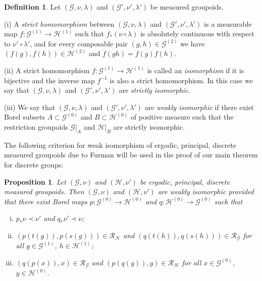\documentclass[11pt, oneside]{amsart}
\newtheorem{prop}[lemma]{Proposition}
\theoremstyle{definition}
\newtheorem{defn}[lemma]{Definition}
\theoremstyle{remark}
\theoremstyle{TheoremNum}
\begin{document}
\begin{defn}\label{def:homomorphism}
  Let $(\mathcal{G}, \nu, \lambda)$ and $(\mathcal{G}',\nu',\lambda')$ be measured groupoids.  
  
\item (i) A \emph{strict homomorphism} between $(\mathcal{G},\nu,\lambda)$ and $(\mathcal{G}',\nu', \lambda')$ is a measurable map $f: \mathcal{G}^{(1)}\to \mathcal{H}^{(1)}$ such that $f_* (\nu\circ \lambda)$
is absolutely continuous with respect to $\nu'\circ\lambda'$, and for every composable pair $(g,h) \in \mathcal{G}^{(2)}$ we have
$(f(g),f(h)) \in \mathcal{H}^{(2)}$ and $f(gh) = f(g)f(h)$.

\item (ii) A strict homomorphism $f: \mathcal{G}^{(1)}\to \mathcal{H}^{(1)}$ is called an \emph{isomorphism} if it is bijective and the inverse map $f^{-1}$ is also a strict homomorphism. In this case we say that $(\mathcal{G},\nu, \lambda)$ and $(\mathcal{G}',\nu', \lambda')$ are \emph{strictly isomorphic}.

\item (iii) We say that $(\mathcal{G},\nu, \lambda)$ and $(\mathcal{G}',\nu', \lambda')$ are \emph{weakly isomorphic} if there exist Borel subsets $A\subset \mathcal{G}^{(0)}$ and $B\subset \mathcal{H}^{(0)}$ of positive measure such that the restriction groupoids $\mathcal{G}|_A$ and $\mathcal{H}|_B$ are strictly isomorphic.
\end{defn}
The following criterion for weak isomorphism of ergodic, principal, discrete measured groupoids due to Furman \cite[Proposition 2.3]{Furman99} will be used in the proof of our main theorem for discrete groups:
\begin{prop}\label{prop:furman:weakly}
  Let $(\mathcal{G},\nu)$ and $(\mathcal{H},\nu')$ be ergodic, principal, discrete measured groupoids. Then $(\mathcal{G},\nu)$ and $(\mathcal{H},\nu')$ are weakly isomorphic
provided that there exist Borel maps $p:\mathcal{G}^{(0)}\to \mathcal{H}^{(0)}$ and $q:\mathcal{H}^{(0)}\to \mathcal{G}^{(0)}$ such that 
  \begin{enumerate}[(i)]
  \item$p_*\nu\prec \nu'$ and $q_*\nu'\prec \nu$;
  \item$(p(t(g)),p(s(g)))\in \mathcal{R}_{\mathcal{H}}$  and $(q(t(h)),q(s(h)))\in \mathcal{R}_{\mathcal{G}}$ for all $g\in \mathcal{G}^{(1)}$, $h\in \mathcal{H}^{(1)}$;
  \item$(q(p(x)),x)\in \mathcal{R}_{\mathcal{G}}$ and $(p(q(y)),y)\in \mathcal{R}_{\mathcal{H}}$ for all $x\in \mathcal{G}^{(0)}$, $y\in \mathcal{H}^{(0)}$.
  \end{enumerate}
\end{prop}
\end{document}

